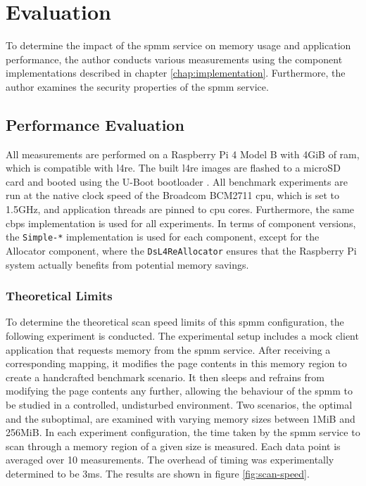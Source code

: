 \chapter{Evaluation}
\label{chap:evaluation}

To determine the impact of the \ac{spmm} service on memory usage and application performance, the author conducts various measurements using the component implementations described in chapter \ref{chap:implementation}.
Furthermore, the author examines the security properties of the \ac{spmm} service.

\section{Performance Evaluation}
\label{sec:performance-evaluation}

All measurements are performed on a Raspberry Pi 4 Model B with 4GiB of \acs{ram}, which is compatible with \ac{l4re}.
The built \ac{l4re} images are flashed to a microSD card and booted using the U-Boot bootloader \cite{u-boot}.
All benchmark experiments are run at the native clock speed of the Broadcom BCM2711 \acs{cpu}, which is set to 1.5GHz, and application threads are pinned to \acs{cpu} cores.
Furthermore, the same \ac{cbps} implementation is used for all experiments.
In terms of component versions, the \texttt{Simple-*} implementation is used for each component, except for the Allocator component, where the \texttt{Ds\-L4Re\-Allocator} ensures that the Raspberry Pi system actually benefits from potential memory savings.

\subsection{Theoretical Limits}
\label{subsec:theoretical-limits}

To determine the theoretical scan speed limits of this \ac{spmm} configuration, the following experiment is conducted.
The experimental setup includes a mock client application that requests memory from the \ac{spmm} service.
After receiving a corresponding mapping, it modifies the page contents in this memory region to create a handcrafted benchmark scenario.
It then sleeps and refrains from modifying the page contents any further, allowing the behaviour of the \ac{spmm} to be studied in a controlled, undisturbed environment.
Two scenarios, the optimal and the suboptimal, are examined with varying memory sizes between 1MiB and 256MiB.
In each experiment configuration, the time taken by the \ac{spmm} service to scan through a memory region of a given size is measured.
Each data point is averaged over 10 measurements.
The overhead of timing was experimentally determined to be 3ms.
The results are shown in figure \ref{fig:scan-speed}.

